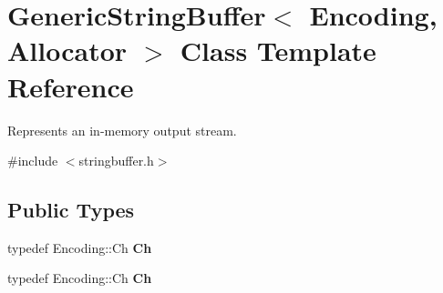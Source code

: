 \hypertarget{class_generic_string_buffer}{}\section{Generic\+String\+Buffer$<$ Encoding, Allocator $>$ Class Template Reference}
\label{class_generic_string_buffer}


Represents an in-\/memory output stream.  




{\ttfamily \#include $<$stringbuffer.\+h$>$}

\subsection*{Public Types}
\begin{DoxyCompactItemize}
\item 
typedef Encoding\+::\+Ch {\bfseries Ch}\hypertarget{class_generic_string_buffer_a735b75db076ffe86d0d294be49655d46}{}\label{class_generic_string_buffer_a735b75db076ffe86d0d294be49655d46}

\item 
typedef Encoding\+::\+Ch {\bfseries Ch}\hypertarget{class_generic_string_buffer_a735b75db076ffe86d0d294be49655d46}{}\label{class_generic_string_buffer_a735b75db076ffe86d0d294be49655d46}

\end{DoxyCompactItemize}
